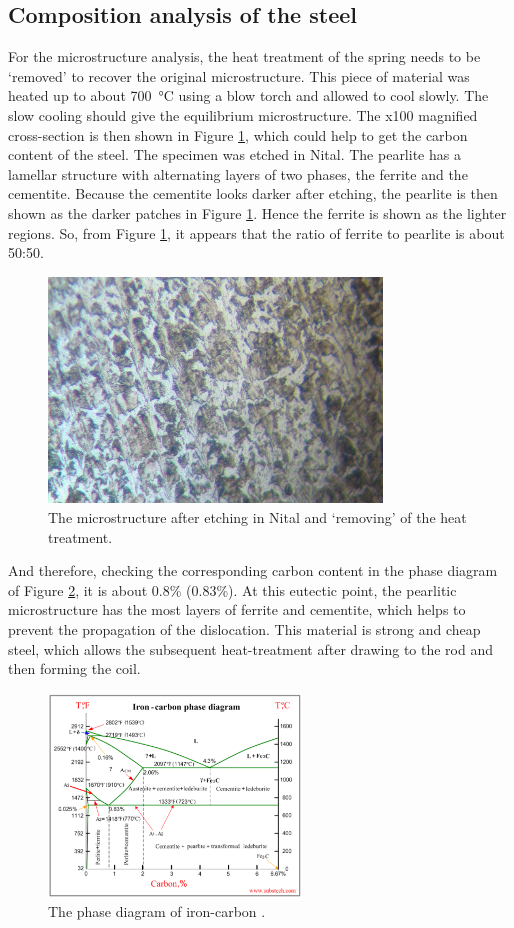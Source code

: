 \documentclass[11pt]{article}
\begin{document}
\subsection{Composition analysis of the steel}
For the microstructure analysis, the heat treatment of the spring needs to be ‘removed’ to recover the original microstructure. This piece of material was heated up to about \SI{700}{\celsius} using a blow torch and allowed to cool slowly. The slow cooling should give the equilibrium microstructure. The x100 magnified cross-section is then shown in Figure \ref{fig:microstructure4}, which could help to get the carbon content of the steel. The specimen was etched in Nital. The pearlite has a lamellar structure with alternating layers of two phases, the ferrite and the cementite. Because the cementite looks darker after etching, the pearlite is then shown as the darker patches in Figure \ref{fig:microstructure4}. Hence the ferrite is shown as the lighter regions. So, from Figure \ref{fig:microstructure4}, it appears that the ratio of ferrite to pearlite is about 50:50.
\begin{figure}[H]
    \centering
    \includegraphics[height = 6cm]{./img/microstructure1.jpeg}
    \caption{The microstructure after etching in Nital and ‘removing’ of the heat treatment.}
    \label{fig:microstructure4}
\end{figure}
And therefore, checking the corresponding carbon content in the phase diagram of Figure \ref{fig:phasediagram}, it is about 0.8\% (0.83\%). At this eutectic point, the pearlitic microstructure has the most layers of ferrite and cementite, which helps to prevent the propagation of the dislocation. This material is strong and cheap steel, which allows the subsequent heat-treatment after drawing to the rod and then forming the coil. 
\begin{figure}[H]
    \centering
    \includegraphics[width = 0.6\textwidth]{./img/phasediagram.png}
    \caption{The phase diagram of iron-carbon \cite{b12}.}
    \label{fig:phasediagram}
\end{figure}
\end{document}
